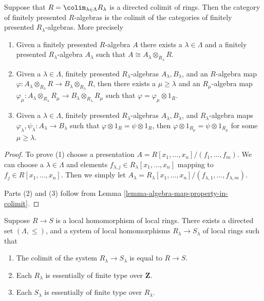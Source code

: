 \begin{lemma}
\label{lemma-colimit-category-fp-algebras}
Suppose that $R = \colim_{\lambda \in \Lambda} R_\lambda$ is a directed colimit
of rings. Then the category of finitely presented $R$-algebras is
the colimit of the categories of finitely presented $R_\lambda$-algebras.
More precisely
\begin{enumerate}
\item Given a finitely presented $R$-algebra $A$ there exists a
$\lambda \in \Lambda$ and a finitely presented $R_\lambda$-algebra
$A_\lambda$ such that $A \cong A_\lambda \otimes_{R_\lambda} R$.
\item Given a $\lambda \in \Lambda$, finitely presented
$R_\lambda$-algebras $A_\lambda, B_\lambda$, and an $R$-algebra map
$\varphi : A_\lambda \otimes_{R_\lambda} R \to B_\lambda \otimes_{R_\lambda} R$,
then there exists a $\mu \geq \lambda$ and an $R_\mu$-algebra map
$\varphi_\mu : A_\lambda \otimes_{R_\lambda} R_\mu \to
B_\lambda \otimes_{R_\lambda} R_\mu$
such that $\varphi = \varphi_\mu \otimes 1_R$.
\item Given a $\lambda \in \Lambda$, finitely presented
$R_\lambda$-algebras $A_\lambda, B_\lambda$, and $R_\lambda$-algebra maps
$\varphi_\lambda, \psi_\lambda : A_\lambda \to B_\lambda$
such that $\varphi \otimes 1_R = \psi \otimes 1_R$, then
$\varphi \otimes 1_{R_\mu} = \psi \otimes 1_{R_\mu}$ for some
$\mu \geq \lambda$.
\end{enumerate}
\end{lemma}

\begin{proof}
To prove (1) choose a presentation
$A = R[x_1, \ldots, x_n]/(f_1, \ldots, f_m)$.
We can choose a $\lambda \in \Lambda$ and elements
$f_{\lambda, j} \in R_\lambda[x_1, \ldots, x_n]$ mapping to
$f_j \in R[x_1, \ldots, x_n]$.
Then we simply let
$A_\lambda =
R_\lambda[x_1, \ldots, x_n]/(f_{\lambda, 1}, \ldots, f_{\lambda, m})$.

\medskip\noindent
Parts (2) and (3) follow from
Lemma \ref{lemma-algebra-map-property-in-colimit}.
\end{proof}

\begin{lemma}
\label{lemma-limit-no-condition-local}
Suppose $R \to S$ is a local homomorphism of local rings.
There exists a directed set $(\Lambda, \leq)$, and
a system of local homomorphisms $R_\lambda \to S_\lambda$
of local rings such that
\begin{enumerate}
\item The colimit of the system $R_\lambda \to S_\lambda$
is equal to $R \to S$.
\item Each $R_\lambda$ is essentially of finite type
over $\mathbf{Z}$.
\item Each $S_\lambda$ is essentially of finite type
over $R_\lambda$.
\end{enumerate}
\end{lemma}

